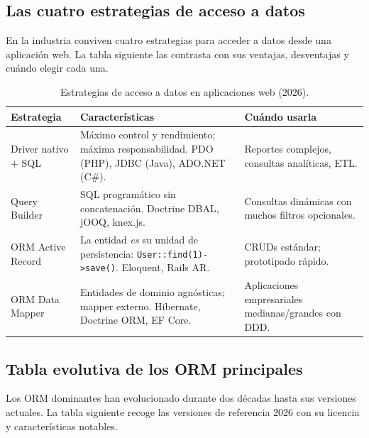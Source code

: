 \documentclass[11pt,a4paper,openany]{book}
\begin{document}
\subsection{Las cuatro estrategias de acceso a datos}

En la industria conviven cuatro estrategias para acceder a
datos desde una aplicación web. La tabla siguiente las contrasta
con sus ventajas, desventajas y cuándo elegir cada una.


\begin{table}[htbp]
\centering
\caption{Estrategias de acceso a datos en aplicaciones web (2026).}
\footnotesize
\begin{tabularx}{\textwidth}{lXX}
\toprule
\textbf{Estrategia} & \textbf{Características} & \textbf{Cuándo usarla}\\
\midrule
Driver nativo + SQL & Máximo control y rendimiento; máxima responsabilidad. PDO (PHP), JDBC (Java), ADO.NET (C\#). & Reportes complejos, consultas analíticas, ETL.\\
Query Builder & SQL programático sin concatenación. Doctrine DBAL, jOOQ, knex.js. & Consultas dinámicas con muchos filtros opcionales.\\
ORM Active Record & La entidad \emph{es} su unidad de persistencia: \texttt{User::find(1)->save()}. Eloquent, Rails AR. & CRUDs estándar; prototipado rápido.\\
ORM Data Mapper & Entidades de dominio agnósticas; mapper externo. Hibernate, Doctrine ORM, EF Core. & Aplicaciones empresariales medianas/grandes con DDD.\\
\bottomrule
\end{tabularx}
\end{table}

\subsection{Tabla evolutiva de los ORM principales}

Los ORM dominantes han evolucionado durante dos décadas
hasta sus versiones actuales. La tabla siguiente recoge las
versiones de referencia 2026 con su licencia y características
notables.
\end{document}
